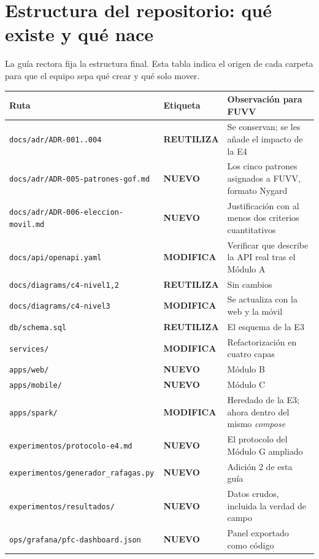\documentclass[11pt,a4paper]{article}
\newcommand{\reuso}{\cellcolor{filaReuso}\textbf{REUTILIZA}}
\newcommand{\cambia}{\cellcolor{filaCambia}\textbf{MODIFICA}}
\newcommand{\nuevo}{\cellcolor{filaNuevo}\textbf{NUEVO}}
\begin{document}
\section{Estructura del repositorio: qué existe y qué nace}

La guía rectora fija la estructura final. Esta tabla indica el origen de cada carpeta para que el equipo sepa qué crear y qué solo mover.

\begin{center}
	\footnotesize
	\begin{longtable}{@{}p{5.4cm}p{1.9cm}p{7.5cm}@{}}
		\toprule
		\textbf{Ruta} & \textbf{Etiqueta} & \textbf{Observación para FUVV} \\
		\midrule
		\endhead
		\texttt{docs/adr/ADR-001..004} & \reuso & Se conservan; se les añade el impacto de la E4 \\
		\texttt{docs/adr/ADR-005-\allowbreak patrones-gof.md} & \nuevo & Los cinco patrones asignados a FUVV, formato Nygard \\
		\texttt{docs/adr/ADR-006-\allowbreak eleccion-movil.md} & \nuevo & Justificación con al menos dos criterios cuantitativos \\
		\texttt{docs/api/openapi.yaml} & \cambia & Verificar que describe la API real tras el Módulo A \\
		\texttt{docs/diagrams/c4-nivel1,2} & \reuso & Sin cambios \\
		\texttt{docs/diagrams/c4-nivel3} & \cambia & Se actualiza con la web y la móvil \\
		\texttt{db/schema.sql} & \reuso & El esquema de la E3 \\
		\texttt{services/} & \cambia & Refactorización en cuatro capas \\
		\texttt{apps/web/} & \nuevo & Módulo B \\
		\texttt{apps/mobile/} & \nuevo & Módulo C \\
		\texttt{apps/spark/} & \cambia & Heredado de la E3; ahora dentro del mismo \emph{compose} \\
		\texttt{experimentos/\allowbreak protocolo-e4.md} & \nuevo & El protocolo del Módulo G ampliado \\
		\texttt{experimentos/\allowbreak generador\_rafagas.py} & \nuevo & Adición 2 de esta guía \\
		\texttt{experimentos/resultados/} & \nuevo & Datos crudos, incluida la verdad de campo \\
		\texttt{ops/grafana/\allowbreak pfc-dashboard.json} & \nuevo & Panel exportado como código \\

\end{longtable}
\end{center}
\end{document}
